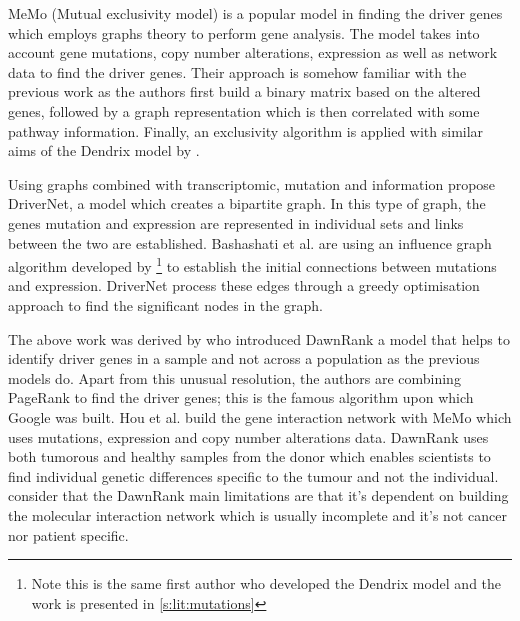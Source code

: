 MeMo (Mutual exclusivity model)\cite{Ciriello2012-hi} is a popular model in finding the driver genes which employs graphs theory to perform gene analysis. The model takes into account gene mutations, copy number alterations, expression as well as network data to find the driver genes. Their approach is somehow familiar with the previous work as the authors first build a binary matrix based on the altered genes, followed by a graph representation which is then correlated with some pathway information. Finally, an exclusivity algorithm is applied with similar aims of the Dendrix model by \citet{Vandin2012-cf}.

Using graphs combined with transcriptomic, mutation and information \citet{Bashashati2012-lk} propose DriverNet, a model which creates a bipartite graph. In this type of graph, the genes mutation and expression are represented in individual sets and links between the two are established. Bashashati et al. are using an influence graph algorithm developed by \citet{Vandin2011-bs}\footnote{Note this is the same first author who developed the Dendrix model and the work is presented in \cref{s:lit:mutations}} to establish the initial connections between mutations and expression. DriverNet process these edges through a greedy optimisation approach to find the significant nodes in the graph. 

The above work was derived by \citet{Hou2014-se} who introduced DawnRank a model that helps to identify driver genes in a sample and not across a population as the previous models do. Apart from this unusual resolution, the authors are combining PageRank to find the driver genes; this is the famous algorithm upon which Google was built. Hou et al. build the gene interaction network with MeMo \cite{Ciriello2012-hi} which uses mutations, expression and copy number alterations data. DawnRank uses both tumorous and healthy samples from the donor which enables scientists to find individual genetic differences specific to the tumour and not the individual. \citet{Hou2014-se} consider that the DawnRank main limitations are that it's dependent on building the molecular interaction network which is usually incomplete and it's not cancer nor patient specific. 


